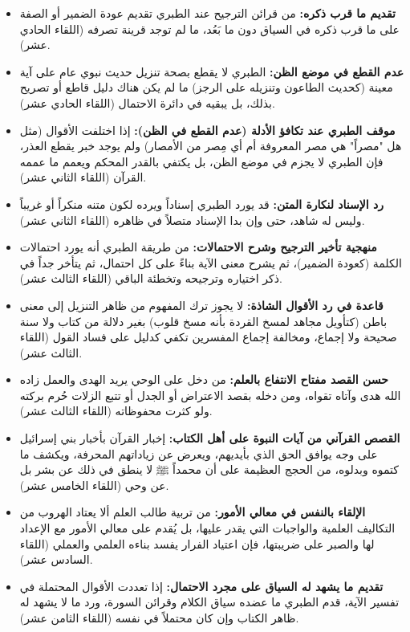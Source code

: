\begin{itemize}
    \item \textbf{تقديم ما قرب ذكره:} من قرائن الترجيح عند الطبري تقديم عودة الضمير أو الصفة على ما قرب ذكره في السياق دون ما بَعُد، ما لم توجد قرينة تصرفه (اللقاء الحادي عشر).
    \item \textbf{عدم القطع في موضع الظن:} الطبري لا يقطع بصحة تنزيل حديث نبوي عام على آية معينة (كحديث الطاعون وتنزيله على الرجز) ما لم يكن هناك دليل قاطع أو تصريح بذلك، بل يبقيه في دائرة الاحتمال (اللقاء الحادي عشر).
    \item \textbf{موقف الطبري عند تكافؤ الأدلة (عدم القطع في الظن):} إذا اختلفت الأقوال (مثل هل "مصراً" هي مصر المعروفة أم أي مِصر من الأمصار) ولم يوجد خبر يقطع العذر، فإن الطبري لا يجزم في موضع الظن، بل يكتفي بالقدر المحكم ويعمم ما عممه القرآن (اللقاء الثاني عشر).
    \item \textbf{رد الإسناد لنكارة المتن:} قد يورد الطبري إسناداً ويرده لكون متنه منكراً أو غريباً وليس له شاهد، حتى وإن بدا الإسناد متصلاً في ظاهره (اللقاء الثاني عشر).
    \item \textbf{منهجية تأخير الترجيح وشرح الاحتمالات:} من طريقة الطبري أنه يورد احتمالات الكلمة (كعودة الضمير)، ثم يشرح معنى الآية بناءً على كل احتمال، ثم يتأخر جداً في ذكر اختياره وترجيحه وتخطئة الباقي (اللقاء الثالث عشر).
    \item \textbf{قاعدة في رد الأقوال الشاذة:} لا يجوز ترك المفهوم من ظاهر التنزيل إلى معنى باطن (كتأويل مجاهد لمسخ القردة بأنه مسخ قلوب) بغير دلالة من كتاب ولا سنة صحيحة ولا إجماع، ومخالفة إجماع المفسرين تكفي كدليل على فساد القول (اللقاء الثالث عشر).
    \item \textbf{حسن القصد مفتاح الانتفاع بالعلم:} من دخل على الوحي يريد الهدى والعمل زاده الله هدى وآتاه تقواه، ومن دخله بقصد الاعتراض أو الجدل أو تتبع الزلات حُرم بركته ولو كثرت محفوظاته (اللقاء الثالث عشر).
    \item \textbf{القصص القرآني من آيات النبوة على أهل الكتاب:} إخبار القرآن بأخبار بني إسرائيل على وجه يوافق الحق الذي بأيديهم، ويعرض عن زياداتهم المحرفة، ويكشف ما كتموه وبدلوه، من الحجج العظيمة على أن محمداً ﷺ لا ينطق في ذلك عن بشر بل عن وحي (اللقاء الخامس عشر).
    \item \textbf{الإلقاء بالنفس في معالي الأمور:} من تربية طالب العلم ألا يعتاد الهروب من التكاليف العلمية والواجبات التي يقدر عليها، بل يُقدم على معالي الأمور مع الإعداد لها والصبر على ضريبتها، فإن اعتياد الفرار يفسد بناءه العلمي والعملي (اللقاء السادس عشر).
    \item \textbf{تقديم ما يشهد له السياق على مجرد الاحتمال:} إذا تعددت الأقوال المحتملة في تفسير الآية، قدم الطبري ما عضده سياق الكلام وقرائن السورة، ورد ما لا يشهد له ظاهر الكتاب وإن كان محتملاً في نفسه (اللقاء الثامن عشر).

\end{itemize}
